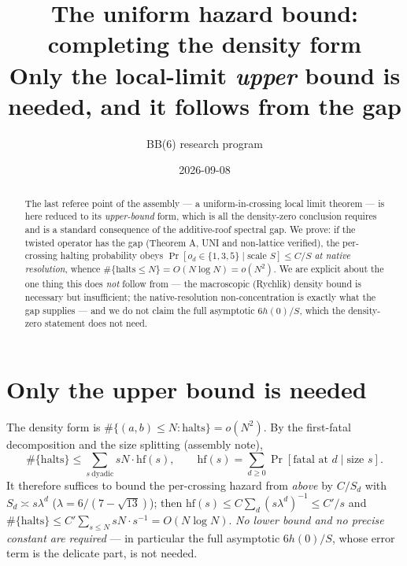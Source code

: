 \documentclass[11pt]{article}
\title{\bfseries The uniform hazard bound: completing the density form\\[2pt]
\large Only the local-limit \emph{upper} bound is needed, and it follows from the gap}
\author{BB(6) research program}\date{2026-09-08}
\theoremstyle{remark}\newtheorem{remark}{Remark}
\begin{document}
\maketitle
\begin{abstract}
The last referee point of the assembly --- a uniform-in-crossing local limit
theorem --- is here reduced to its \emph{upper-bound} form, which is all the
density-zero conclusion requires and is a standard consequence of the additive-roof
spectral gap. We prove: if the twisted operator has the gap (Theorem A, UNI
and non-lattice verified), the per-crossing halting probability obeys
$\Pr[o_d\in\{1,3,5\}\mid\text{scale }S]\le C/S$ \emph{at native resolution},
whence $\#\{\text{halts}\le N\}=O(N\log N)=o(N^2)$. We are explicit about the
one thing this does \emph{not} follow from --- the macroscopic (Rychlik)
density bound is necessary but insufficient; the native-resolution
non-concentration is exactly what the gap supplies --- and we do not claim the
full asymptotic $6h(0)/S$, which the density-zero statement does not need.
\end{abstract}

\section{Only the upper bound is needed}
The density form is $\#\{(a,b)\le N:\text{halts}\}=o(N^2)$. By the first-fatal
decomposition and the size splitting (assembly note),
\[
\#\{\text{halts}\}\le\sum_{s\ \mathrm{dyadic}} sN\cdot\mathrm{hf}(s),\qquad
\mathrm{hf}(s)=\sum_{d\ge0}\Pr[\text{fatal at }d\mid\text{size }s].
\]
It therefore suffices to bound the per-crossing hazard from \emph{above} by
$C/S_d$ with $S_d\asymp s\lambda^d$ ($\lambda=6/(7-\sqrt{13})$); then
$\mathrm{hf}(s)\le C\sum_d(s\lambda^d)^{-1}\le C'/s$ and
$\#\{\text{halts}\}\le C'\sum_{s\le N} sN\cdot s^{-1}=O(N\log N)$. \emph{No
lower bound and no precise constant are required} --- in particular the full
asymptotic $6h(0)/S$, whose error term is the delicate part, is not needed.
\end{document}
